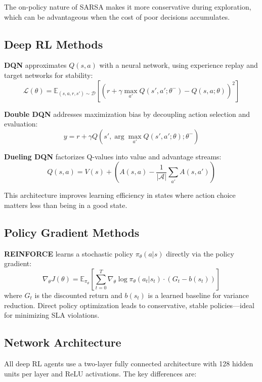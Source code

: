 \documentclass[conference]{IEEEtran}
\begin{document}
The on-policy nature of SARSA makes it more conservative during exploration, which can be advantageous when the cost of poor decisions accumulates.

\subsection{Deep RL Methods}

\textbf{DQN} \cite{mnih2015} approximates $Q(s,a)$ with a neural network, using experience replay and target networks for stability:
\begin{equation}
\mathcal{L}(\theta) = \mathbb{E}_{(s,a,r,s') \sim \mathcal{D}} \left[ \left( r + \gamma \max_{a'} Q(s', a'; \theta^-) - Q(s, a; \theta) \right)^2 \right]
\end{equation}

\textbf{Double DQN} \cite{hasselt2016} addresses maximization bias by decoupling action selection and evaluation:
\begin{equation}
y = r + \gamma Q(s', \arg\max_{a'} Q(s', a'; \theta); \theta^-)
\end{equation}

\textbf{Dueling DQN} \cite{wang2016} factorizes Q-values into value and advantage streams:
\begin{equation}
Q(s, a) = V(s) + \left( A(s, a) - \frac{1}{|\mathcal{A}|} \sum_{a'} A(s, a') \right)
\end{equation}

This architecture improves learning efficiency in states where action choice matters less than being in a good state.

\subsection{Policy Gradient Methods}

\textbf{REINFORCE} \cite{williams1992} learns a stochastic policy $\pi_\theta(a|s)$ directly via the policy gradient:
\begin{equation}
\nabla_\theta J(\theta) = \mathbb{E}_{\pi_\theta} \left[ \sum_{t=0}^{T} \nabla_\theta \log \pi_\theta(a_t|s_t) \cdot (G_t - b(s_t)) \right]
\end{equation}
where $G_t$ is the discounted return and $b(s_t)$ is a learned baseline for variance reduction. Direct policy optimization leads to conservative, stable policies---ideal for minimizing SLA violations.

\subsection{Network Architecture}
All deep RL agents use a two-layer fully connected architecture with 128 hidden units per layer and ReLU activations. The key differences are:
\end{document}
